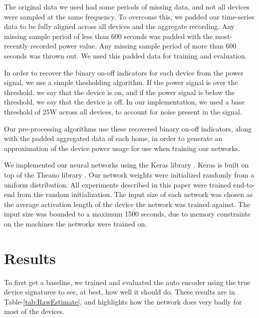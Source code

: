 \documentclass{article}
\begin{document}
The original data we used had some periods of missing data, and not all devices were sampled at the same frequency.
To overcome this, we padded our time-series data to be fully aligned across all devices and the aggregate recording.
Any missing sample period of less than 600 seconds was padded with the most-recently recorded power value.
Any missing sample period of more than 600 seconds was thrown out.
We used this padded data for training and evaluation.

In order to recover the binary on-off indicators for each device from the power signal, we use a simple thesholding algorithm.
If the power signal is over the threshold, we say that the device is on, and if the power signal is below the threshold, we say that the device is off.
In our implementation, we used a base threshold of 25W across all devices, to account for noise present in the signal.

Our pre-processing algorithms use these recovered binary on-off indicators, along with the padded aggregated data of each home, in order to generate an approximation of the device power usage for use when training our networks.

We implemented our neural networks using the Keras library \cite{Keras}.
Keras is built on top of the Theano library \cite{Theano, Theano2}.
Our network weights were initialized randomly from a uniform distribution.
All experiments described in this paper were trained end-to-end from the random initialization.
The input size of each network was chosen as the average activation length of the device the network was trained against.
The input size was bounded to a maximum 1500 seconds, due to memory constraints on the machines the networks were trained on.

\section{Results}


To first get a baseline, we trained and evaluated the auto encoder using the true device signatures to see, at best, how well it should do.
These results are in Table-\ref{tab:RawEstimate}, and highlights how the network does very badly for most of the devices.
\end{document}
